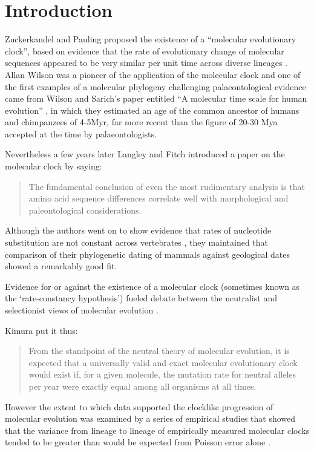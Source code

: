 \section{Introduction} 
Zuckerkandel and Pauling proposed the existence of a ``molecular evolutionary clock'', based on evidence that the rate of evolutionary change of molecular sequences appeared to be very similar per unit time across diverse lineages \cite{zuckerkandl1965}. Allan Wilson was a pioneer of the application of the molecular clock and one of the first examples of a molecular phylogeny challenging palaeontological evidence came from Wilson and Sarich's paper entitled ``A molecular time scale for human evolution'' \cite{WilsonSarich1969}, in which they estimated an age of the common ancestor of humans and chimpanzees of 4-5Myr, far more recent than the figure of 20-30 Mya accepted at the time by palaeontologists.

Nevertheless a few years later Langley and Fitch \cite{LangleyFitch1974} introduced a paper on the molecular clock by saying:

\begin{quotation}
The fundamental conclusion of even the most rudimentary analysis is that amino acid sequence differences correlate well with morphological and paleontological considerations.
\end{quotation}

Although the authors went on to show evidence that rates of nucleotide substitution are not constant across vertebrates \cite{LangleyFitch1974}, they maintained that comparison of their phylogenetic dating of mammals against geological dates showed a remarkably good fit. 

Evidence for or against the existence of a molecular clock (sometimes known as the `rate-constancy hypothesis') fueled debate between the neutralist and selectionist views of molecular evolution \cite{Kimura1987}.

Kimura \cite{Kimura1987} put it thus:

\begin{quotation}
From the standpoint of the neutral theory of molecular evolution, it is expected that a universally valid and exact molecular evolutionary clock would exist if, for a given molecule, the mutation rate for neutral alleles per year were exactly equal among all organisms at all times.
\end{quotation}
 
However the extent to which data supported the clocklike progression of molecular evolution was examined by a series of empirical studies that showed that the variance from lineage to lineage of empirically measured molecular clocks tended to be greater than would be expected from Poisson error alone \cite{LangleyFitch1974,Kimura1987}.

  
  
  
  
  
  
  
  
  
  
  
  
  
  
  
  
  
  
  
  
  
  
  
  
  